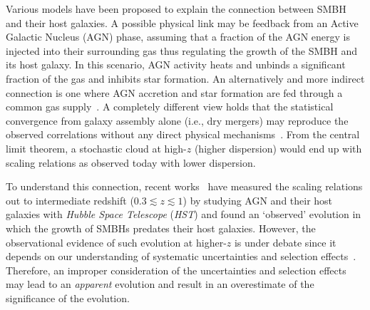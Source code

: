 \documentclass{natureprintstyle}
\begin{document}
Various models have been proposed to explain the connection between SMBH and their host galaxies. A possible physical link may be feedback from an Active Galactic Nucleus (AGN) phase, assuming that a fraction of the AGN energy is injected into their surrounding gas thus regulating the growth of the SMBH and its host galaxy. In this scenario, AGN activity heats and unbinds a significant fraction of the gas and inhibits star formation. An alternatively and more indirect connection is one where AGN accretion and star formation are fed through a common gas supply~\cite{Cen2015, Menci2016}. A completely different view holds that the statistical convergence from galaxy assembly alone (i.e., dry mergers) may reproduce the observed correlations without any direct physical mechanisms~\cite{Peng2007, Jahnke2011, Hirschmann2010}. From the central limit theorem, a stochastic cloud at high-$z$ (higher dispersion) would end up with scaling relations as observed today with lower dispersion.

To understand this connection, recent works~\cite{Park15, Tre++07, Bennert11, Woo++08} have measured the scaling relations out to intermediate redshift {($0.3\lesssim z \lesssim1$)} by studying AGN and their host galaxies with {\it Hubble Space Telescope} ({\it HST}) and found an `observed' evolution in which the growth of SMBHs predates their host galaxies. However, the observational evidence of such evolution at higher-$z$ is under debate since it depends on our understanding of systematic uncertainties and selection effects~\cite{Tre++07,Lauer2007}. Therefore, an improper consideration of the uncertainties and selection effects may lead to an {\it apparent} evolution and result in an overestimate of the significance of the evolution\cite{Volonteri2011}.
\end{document}
